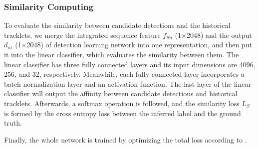 \documentclass[times,twocolumn,final,authoryear]{elsarticle}
\begin{document}
\vspace{5pt}
\noindent
\subsubsection{Similarity Computing}
{
To evaluate the similarity between candidate detections and the historical tracklets, we merge the integrated sequence feature $f_{Sn}$ (1$\times$2048) and the output $d_{nt}$ (1$\times$2048) of detection learning network into one representation, 
and then put it into the linear classifier, which evaluates the similarity between them.
The linear classifier has three fully connected layers and its input dimensions are 4096, 256, and 32, respectively.}
Meanwhile, each fully-connected layer incorporates a batch normalization layer and an activation function.
The last layer of the linear classifier will output the affinity between candidate detections and historical tracklets. 
Afterwards, a softmax operation is followed,
and the similarity loss $L_S$ is formed by the cross entropy loss between the inferred label and the ground truth.

Finally, the whole network is trained by optimizing the total loss according to .
\end{document}
